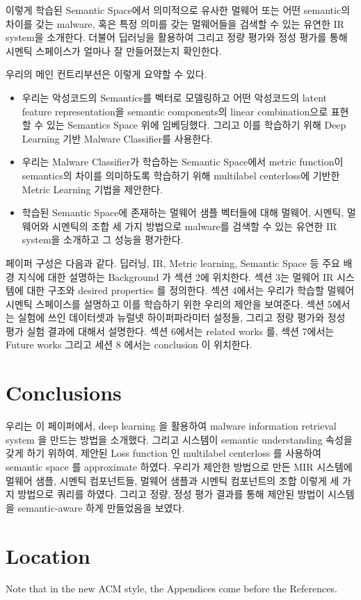 이렇게 학습된 Semantic Space에서 의미적으로 유사한 멀웨어 또는 어떤 semantic의 차이를 갖는 malware, 혹은 특정 의미를 갖는 멀웨어들을 검색할 수 있는 유연한 IR system을 소개한다. 더불어 딥러닝을 활용하여  그리고 정량 평가와 정성 평가를 통해 시멘틱 스페이스가 얼마나 잘 만들어졌는지 확인한다.  

우리의 메인 컨트리부션은 이렇게 요약할 수 있다.

\begin{itemize}
\item 우리는 악성코드의 Semantics를 벡터로 모델링하고 어떤 악성코드의 latent feature representation을 semantic components의 linear combination으로 표현할 수 있는 Semantics Space 위에 임베딩했다. 그리고 이를 학습하기 위해 Deep Learning 기반 Malware Classifier를 사용한다.
\item 우리는 Malware Classifier가 학습하는 Semantic Space에서 metric function이 semantics의 차이를 의미하도록 학습하기 위해 multilabel centerloss에 기반한 Metric Learning 기법을 제안한다.
\item 학습된 Semantic Space에 존재하는 멀웨어 샘플 벡터들에 대해 멀웨어, 시멘틱, 멀웨어와 시멘틱의 조합 세 가지 방법으로 malware를 검색할 수 있는 유연한 IR system을 소개하고 그 성능을 평가한다.
\end{itemize}

페이퍼 구성은 다음과 같다. 딥러닝, IR, Metric learning, Semantic Space 등 주요 배경 지식에 대한 설명하는 Background 가 섹션 2에 위치한다. 섹션 3는 멀웨어 IR 시스템에 대한 구조와 desired properties 를 정의한다. 섹션 4에서는 우리가 학습할 멀웨어 시멘틱 스페이스를 설명하고 이를 학습하기 위한 우리의 제안을 보여준다. 섹션 5에서는 실험에 쓰인 데이터셋과 뉴럴넷 하이퍼파라미터 설정들, 그리고 정량 평가와 정성 평가 실험 결과에 대해서 설명한다. 섹션 6에서는 related works 를, 섹션 7에서는 Future works 그리고 세션 8 에서는 conclusion 이 위치한다. 








\section{Conclusions}

우리는 이 페이퍼에서, deep learning 을 활용하여 malware information retrieval system 을 만드는 방법을 소개했다. 그리고 시스템이 semantic understanding 속성을 갖게 하기 위하여, 제안된 Loss function 인 multilabel centerloss 를 사용하여 semantic space 를 approximate 하였다. 우리가 제안한 방법으로 만든 MIR 시스템에 멀웨어 샘플, 시멘틱 컴포넌트들, 멀웨어 샘플과 시멘틱 컴포넌트의 조합 이렇게 세 가지 방법으로 쿼리를 하였다. 그리고 정량, 정성 평가 결과를 통해 제안된 방법이 시스템을 semantic-aware 하게 만들었음을 보였다. 

\appendix

\section{Location}

Note that in the new ACM style, the Appendices come before the References.


\begin{acks}
\end{acks}
